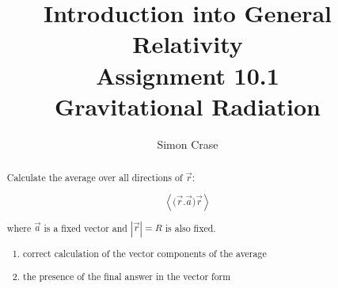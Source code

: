 \documentclass[]{article}
\title{Introduction into General Relativity\\Assignment 10.1\\Gravitational Radiation}
\author{Simon Crase}
\begin{document}
\maketitle

\begin{abstract}
Calculate the average over all directions of $\vec{r}$:

$$\left\langle \big(\vec{r}.\vec{a}\big)\vec{r} \right\rangle$$

where $\vec{a}$ is a fixed vector and $|\vec{r}|=R$ is also fixed.
\begin{enumerate}
	\item correct calculation of the vector components of the average
	\item the presence of the final answer in the vector form
	

\end{enumerate}
\end{abstract}

\section{}
\end{document}
